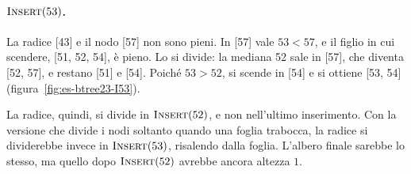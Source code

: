 \paragraph{$\textsc{Insert}(53)$.}
La radice [43] e il nodo [57] non sono pieni. In [57] vale $53 < 57$, e il figlio in cui scendere, [51, 52, 54], è pieno. Lo si divide: la mediana 52 sale in [57], che diventa [52, 57], e restano [51] e [54]. Poiché $53 > 52$, si scende in [54] e si ottiene [53, 54] (figura~\ref{fig:es-btree23-I53}).

La radice, quindi, si divide in $\textsc{Insert}(52)$, e non nell'ultimo inserimento. Con la versione che divide i nodi soltanto quando una foglia trabocca, la radice si dividerebbe invece in $\textsc{Insert}(53)$, risalendo dalla foglia. L'albero finale sarebbe lo stesso, ma quello dopo $\textsc{Insert}(52)$ avrebbe ancora altezza $1$.

